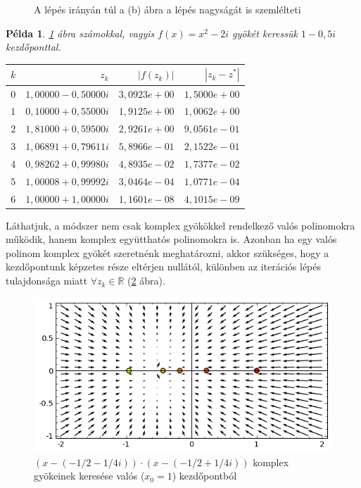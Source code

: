 \documentclass[a4paper,12pt]{report}
\newtheorem{Pl}[Tet]{Példa}
\begin{document}
\begin{figure}[ht]
				\caption{A lépés irányán túl a (b) ábra a lépés nagyságát is szemlélteti} \label{k4}
			\end{figure}
			
			\begin{Pl}
				\ref{k4} ábra számokkal, vagyis $f(x)=x^2-2i$ gyökét keressük $1-0,\!5i$ kezdőponttal.
				\begin{center}
					\begin{tabular}{|r|r|r|r|}
						\hline
						$k$ & $z_k$                & $|f(z_k)|$    & $|z_k-z^*|$  \\ \hline
						$0$ & $1,\!00000 - 0,\!50000i$ & $3,\!0923e+00$  & $1,\!5000e+00$ \\ 
						$1$ & $0,\!10000 + 0,\!55000i$ & $1,\!9125e+00$  & $1,\!0062e+00$ \\ 
						$2$ & $1,\!81000 + 0,\!59500i$ & $2,\!9261e+00$  & $9,\!0561e-01$ \\ 
						 $3$ & $1,\!06891 + 0,\!79611i$ & $5,\!8966e-01$  & $2,\!1522e-01$ \\ 
						$4$ & $0,\!98262 + 0,\!99980i$ & $4,\!8935e-02$  & $1,\!7377e-02$ \\ 
						$5$ & $1,\!00008 + 0,\!99992i$ & $3,\!0464e-04$  & $1,\!0771e-04$ \\ 
						$6$ & $1,\!00000 + 1,\!00000i$ & $1,\!1601e-08$  & $4,\!1015e-09$ \\
						\hline
					\end{tabular}
				\end{center}
			\end{Pl}
			Láthatjuk, a módszer nem csak komplex gyökökkel rendelkező valós polinomokra működik, hanem komplex együtthatós polinomokra is. Azonban ha egy valós polinom komplex gyökét szeretnénk meghatározni, akkor szükséges, hogy a kezdőpontunk képzetes része eltérjen nullától, különben az iterációs lépés tulajdonsága miatt $\forall z_k\in \mathbb{R}$ (\ref{k5} ábra).
			
			\begin{figure}[ht]
				\begin{center}
				\includegraphics[scale=0.62]{kep5.png}
				\caption{$(x-( - 1/2-1/4i))\cdot (x-( - 1/2+1/4i))$ komplex gyökeinek keresése valós ($x_0=1$) kezdőpontból} \label{k5}
				\end{center}
			\end{figure}
			
\end{document}

